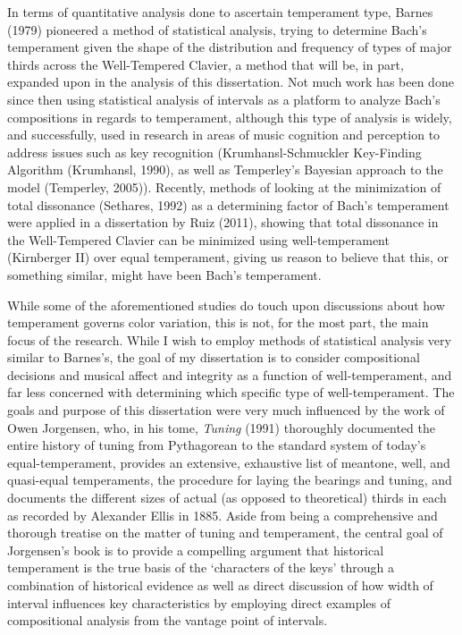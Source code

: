 In terms of quantitative analysis done to ascertain temperament type,
Barnes (1979) pioneered a method of statistical analysis, trying to
determine Bach's temperament given the shape of the distribution and
frequency of types of major thirds across the Well-Tempered Clavier, a
method that will be, in part, expanded upon in the analysis of this
dissertation. Not much work has been done since then using statistical
analysis of intervals as a platform to analyze Bach's compositions in
regards to temperament, although this type of analysis is widely, and
successfully, used in research in areas of music cognition and
perception to address issues such as key recognition
(Krumhansl-Schmuckler Key-Finding Algorithm (Krumhansl, 1990), as well
as Temperley's Bayesian approach to the model (Temperley, 2005)).
Recently, methods of looking at the minimization of total dissonance
(Sethares, 1992) as a determining factor of Bach's temperament were
applied in a dissertation by Ruiz (2011), showing that total dissonance
in the Well-Tempered Clavier can be minimized using well-temperament
(Kirnberger II) over equal temperament, giving us reason to believe that
this, or something similar, might have been Bach's temperament.

While some of the aforementioned studies do touch upon discussions about
how temperament governs color variation, this is not, for the most part,
the main focus of the research. While I wish to employ methods of
statistical analysis very similar to Barnes's, the goal of my
dissertation is to consider compositional decisions and musical affect
and integrity as a function of well-temperament, and far less concerned
with determining which specific type of well-temperament. The goals and
purpose of this dissertation were very much influenced by the work of
Owen Jorgensen, who, in his tome, \emph{Tuning} (1991) thoroughly
documented the entire history of tuning from Pythagorean to the standard
system of today's equal-temperament, provides an extensive, exhaustive
list of meantone, well, and quasi-equal temperaments, the procedure for
laying the bearings and tuning, and documents the different sizes of
actual (as opposed to theoretical) thirds in each as recorded by
Alexander Ellis in 1885. Aside from being a comprehensive and thorough
treatise on the matter of tuning and temperament, the central goal of
Jorgensen's book is to provide a compelling argument that historical
temperament is the true basis of the `characters of the keys' through a
combination of historical evidence as well as direct discussion of how
width of interval influences key characteristics by employing direct
examples of compositional analysis from the vantage point of intervals.

